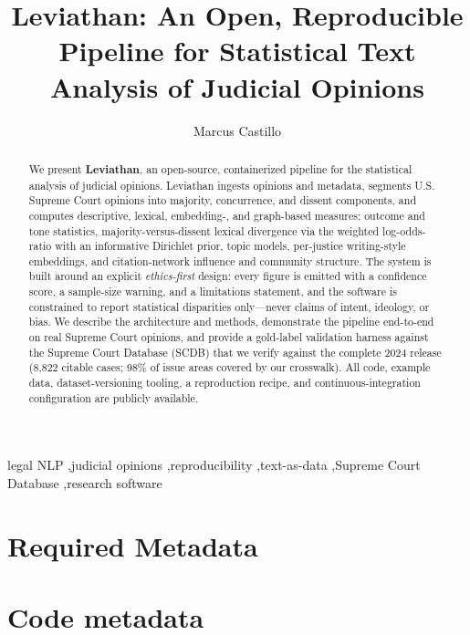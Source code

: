 \documentclass[preprint,12pt]{elsarticle}
\newcommand{\FILL}[1]{{\color{red}\textbf{[FILL: #1]}}}
\begin{document}
\begin{frontmatter}

\title{Leviathan: An Open, Reproducible Pipeline for Statistical Text Analysis of Judicial Opinions}

\author[ind]{Marcus Castillo}
\address[ind]{\FILL{affiliation / ``Independent Researcher''; add ORCID}}

\begin{abstract}
We present \textbf{Leviathan}, an open-source, containerized pipeline for the statistical analysis of
judicial opinions. Leviathan ingests opinions and metadata, segments U.S. Supreme Court opinions into
majority, concurrence, and dissent components, and computes descriptive, lexical, embedding-, and
graph-based measures: outcome and tone statistics, majority-versus-dissent lexical divergence via the
weighted log-odds-ratio with an informative Dirichlet prior, topic models, per-justice writing-style
embeddings, and citation-network influence and community structure. The system is built around an
explicit \emph{ethics-first} design: every figure is emitted with a confidence score, a sample-size
warning, and a limitations statement, and the software is constrained to report statistical
disparities only---never claims of intent, ideology, or bias. We describe the architecture and
methods, demonstrate the pipeline end-to-end on real Supreme Court opinions, and provide a
gold-label validation harness against the Supreme Court Database (SCDB) that we verify against the
complete 2024 release (8{,}822 citable cases; 98\% of issue areas covered by our crosswalk). All
code, example data, dataset-versioning tooling, a reproduction recipe, and continuous-integration
configuration are publicly available.
\end{abstract}

\begin{keyword}
legal NLP \sep judicial opinions \sep reproducibility \sep text-as-data \sep Supreme Court Database
\sep research software
\end{keyword}

\end{frontmatter}

\section*{Required Metadata}
\section*{Code metadata}
\end{document}

